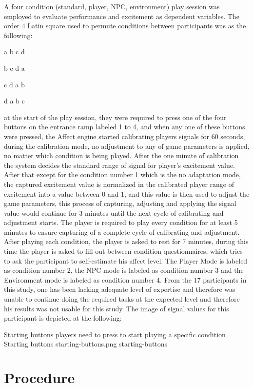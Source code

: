A four condition (standard, player, NPC, environment) play session was employed to evaluate performance and excitement as dependent variables. The order 4 Latin square used to permute conditions between participants was as the following:

\centerline{a b c d}
\centerline{b c d a}
\centerline{c d a b}
\centerline{d a b c}

at the start of the play session, they were required to press one of the four buttons on the entrance ramp labeled 1 to 4, and when any one of these buttons were pressed, the Affect engine started calibrating players signals for 60 seconds, during the calibration mode, no adjustment to any of game parameters is applied, no matter which condition is being played. After the one minute of calibration the system decides the standard range of signal for player's excitement value. After that except for the condition number 1 which is the no adaptation mode, the captured excitement value is normalized in the calibrated player range of excitement into a value between 0 and 1, and this value is then used to adjust the game parameters, this process of capturing, adjusting and applying the signal value would continue for 3 minutes until the next cycle of calibrating and adjustment starts. The player is required to play every condition for at least 5 minutes to ensure capturing of a complete cycle of calibrating and adjustment. After playing each condition, the player is asked to rest for 7 minutes, during this time the player is asked to fill out between condition questionnaires, which tries to ask the participant to self-estimate his affect level. The Player Mode is labeled as condition number 2, the NPC mode is labeled as condition number 3 and the Environment mode is labeled as condition number 4. From the 17 participants in this study, one has been lacking adequate level of expertise and therefore was unable to continue doing the required tasks at the expected level and therefore his results was not usable for this study. The image of signal values for this participant is depicted at the following:

\img
{Starting buttons players need to press to start playing a specific condition}
{Starting buttons}
{starting-buttons.png}
{starting-buttons}

\section{Procedure}

